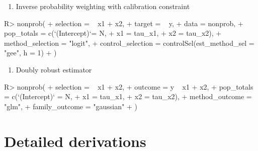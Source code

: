 \documentclass[
]{jss}
\providecommand{\tightlist}{%
  \setlength{\itemsep}{0pt}\setlength{\parskip}{0pt}}
\begin{document}
\begin{enumerate}
\def\labelenumi{\arabic{enumi}.}
\setcounter{enumi}{2}
\tightlist
\item
  Inverse probability weighting with calibration constraint
\end{enumerate}

\begin{CodeChunk}
\begin{CodeInput}
R> nonprob(
+   selection =  ~ x1 + x2, 
+   target = ~ y, 
+   data = nonprob, 
+   pop_totals = c(`(Intercept)`= N, 
+                  x1 = tau_x1, 
+                  x2 = tau_x2), 
+   method_selection = "logit", 
+   control_selection = controlSel(est_method_sel = "gee", h = 1)
+ )
\end{CodeInput}
\end{CodeChunk}

\begin{enumerate}
\def\labelenumi{\arabic{enumi}.}
\setcounter{enumi}{3}
\tightlist
\item
  Doubly robust estimator
\end{enumerate}

\begin{CodeChunk}
\begin{CodeInput}
R> nonprob(
+   selection = ~ x1 + x2, 
+   outcome = y ~ x1 + x2, 
+   pop_totals = c(`(Intercept)` = N, 
+                  x1 = tau_x1, 
+                  x2 = tau_x2), 
+   method_outcome = "glm", 
+   family_outcome = "gaussian"
+ )
\end{CodeInput}
\end{CodeChunk}

\clearpage

\section{Detailed derivations}\label{sec-derivations}
\end{document}
